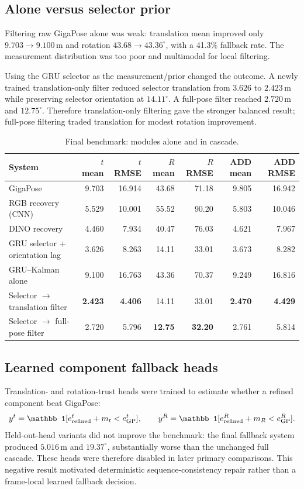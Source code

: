 \documentclass[11pt]{article}
\newcommand{\best}[1]{\textbf{#1}}
\newcommand{\unitm}{\,\mathrm{m}}
\newcommand{\unitdeg}{^{\circ}}
\begin{document}
\subsection{Alone versus selector prior}

Filtering raw GigaPose alone was weak: translation mean improved only $9.703\rightarrow9.100\unitm$ and rotation $43.68\rightarrow43.36\unitdeg$, with a 41.3\% fallback rate.  The measurement distribution was too poor and multimodal for local filtering.

Using the GRU selector as the measurement/prior changed the outcome.  A newly trained translation-only filter reduced selector translation from $3.626$ to $2.423\unitm$ while preserving selector orientation at $14.11\unitdeg$.  A full-pose filter reached $2.720\unitm$ and $12.75\unitdeg$.  Therefore translation-only filtering gave the stronger balanced result; full-pose filtering traded translation for modest rotation improvement.

\begin{table}[H]
\centering
\caption{Final benchmark: modules alone and in cascade.}
\begin{tabular}{lrrrrrr}
\toprule
System & $t$ mean & $t$ RMSE & $R$ mean & $R$ RMSE & ADD mean & ADD RMSE\\
\midrule
GigaPose & 9.703 & 16.914 & 43.68 & 71.18 & 9.805 & 16.942\\
RGB recovery (CNN) & 5.529 & 10.001 & 55.52 & 90.20 & 5.803 & 10.046\\
DINO recovery & 4.460 & 7.934 & 40.47 & 76.03 & 4.621 & 7.967\\
GRU selector + orientation lag & 3.626 & 8.263 & 14.11 & 33.01 & 3.673 & 8.282\\
GRU--Kalman alone & 9.100 & 16.763 & 43.36 & 70.37 & 9.249 & 16.816\\
Selector $\rightarrow$ translation filter & \best{2.423} & \best{4.406} & 14.11 & 33.01 & \best{2.470} & \best{4.429}\\
Selector $\rightarrow$ full-pose filter & 2.720 & 5.796 & \best{12.75} & \best{32.20} & 2.761 & 5.814\\
\bottomrule
\end{tabular}
\end{table}

\subsection{Learned component fallback heads}

Translation- and rotation-trust heads were trained to estimate whether a refined component beat GigaPose:
\begin{equation}
y^t=\mathbb 1[e^t_{\rm refined}+m_t<e^t_{\rm GP}],\qquad
y^R=\mathbb 1[e^R_{\rm refined}+m_R<e^R_{\rm GP}].
\end{equation}
Held-out-head variants did not improve the benchmark: the final fallback system produced $5.016\unitm$ and $19.37\unitdeg$, substantially worse than the unchanged full cascade.  These heads were therefore disabled in later primary comparisons.  This negative result motivated deterministic sequence-consistency repair rather than a frame-local learned fallback decision.
\end{document}
